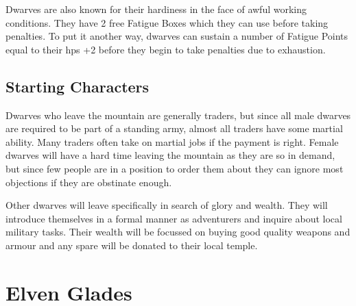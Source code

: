 \begin{multicols}{2}
Dwarves are also known for their hardiness in the face of awful working conditions. They have 2 free Fatigue Boxes which they can use before taking penalties. To put it another way, dwarves can sustain a number of Fatigue Points equal to their \glspl{hp} +2 before they begin to take penalties due to exhaustion.

\subsection{Starting Characters}\label{starting_characters}

Dwarves who leave the mountain are generally traders, but since all male dwarves are required to be part of a standing army, almost all traders have some martial ability. Many traders often take on martial jobs if the payment is right. Female dwarves will have a hard time leaving the mountain as they are so in demand, but since few people are in a position to order them about they can ignore most objections if they are obstinate enough.

Other dwarves will leave specifically in search of glory and wealth. They will introduce themselves in a formal manner as adventurers and inquire about local military tasks. Their wealth will be focussed on buying good quality weapons and armour and any spare will be donated to their local temple.

\end{multicols}

\section[Elves]{Elven Glades}

